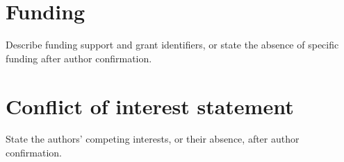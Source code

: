 \documentclass[11pt,a4paper]{article}
\begin{document}
\section*{Funding}
Describe funding support and grant identifiers, or state the absence of specific funding after author confirmation.

\section*{Conflict of interest statement}
State the authors' competing interests, or their absence, after author confirmation.




\end{document}
